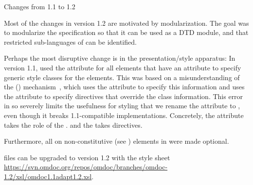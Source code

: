 
\begin{tsection}[id=changes1.2]{Changes from 1.1 to 1.2}

  Most of the changes in version 1.2 are motivated by modularization. The goal was
  to modularize the specification so that it can be used as a DTD module, and that
  restricted sub-languages of {\omdoc} can be identified. 
  
  Perhaps the most disruptive change is in the presentation/style apparatus: In version
  1.1, {\omdoc} used the {} attribute for all elements that have an
  {} attribute to specify generic style classes for the {\omdoc}
  elements.  This was based on a misunderstanding of the {\xml} {} ({\css}) mechanism~\cite{BosHak:css98}, which uses the
  {} attribute to specify this information and uses the
  {} attribute to specify {\css} directives
  that override the class information.  This error in {} so severely limits
  the usefulness for styling that we rename the {}
  {} attribute to
  {}, even though it breaks 1.1-compatible
  implementations. Concretely, the {} {} attribute takes
  the role of the {} {}. and the {} {}\label{style/class-comment} takes {\css} directives.

  Furthermore, all {} on non-constitutive (see
  {}) elements in {\omdoc} were made optional.
  
  {} files can be upgraded to version 1.2 with the {\xslt} style sheet
    \url{https://svn.omdoc.org/repos/omdoc/branches/omdoc-1.2/xsl/omdoc1.1adapt1.2.xsl}.


\end{tsection}
